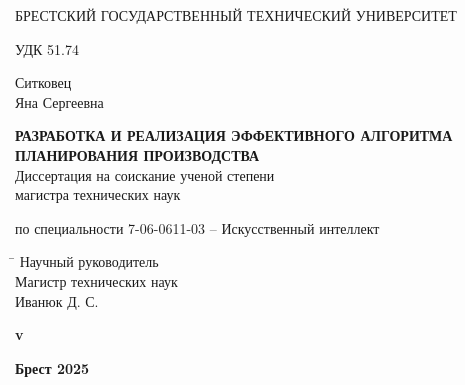\begin{titlepage}

    \begin{center} \bfseries
        \bigskip
        \medskip

        {БРЕСТСКИЙ ГОСУДАРСТВЕННЫЙ ТЕХНИЧЕСКИЙ УНИВЕРСИТЕТ}
    \end{center}
    \vspace{1cm}

    \noindent УДК 51.74 \\
    \vspace{1cm}

    \begin{center}
        {Ситковец \\ Яна Сергеевна}\\
        \vspace{1cm}

        {\bfseries РАЗРАБОТКА И РЕАЛИЗАЦИЯ ЭФФЕКТИВНОГО АЛГОРИТМА ПЛАНИРОВАНИЯ ПРОИЗВОДСТВА}\\
        \vspace{2cm}
        Диссертация на соискание ученой степени\\
        магистра технических наук\\
        \bigskip

        по специальности 7-06-0611-03 -- Искусственный интеллект
    \end{center}
    \vspace{3cm}

    \begin{tabbing}
        \hspace{8cm} \= \kill \>
        Научный руководитель \+ \\
        Магистр технических наук \\
        Иванюк Д. С.
    \end{tabbing}


    \ifdefined\dissertationversion
        \vspace{3cm}
        \begin{center}
            \bfseries v\dissertationversion
        \end{center}
        \vspace{3cm}
    \else
        \vspace{5cm}
    \fi

    \begin{center}
        \bfseries Брест 2025
    \end{center}

\end{titlepage}
